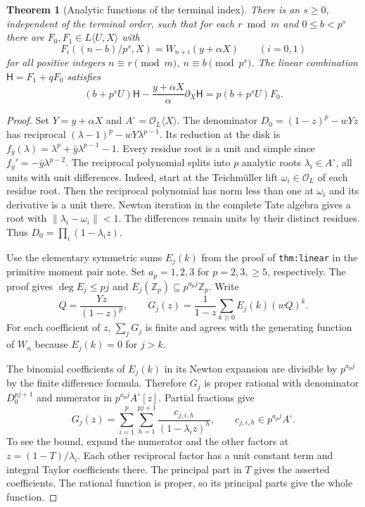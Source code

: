 \documentclass[11pt]{article}
\newtheorem{theorem}{Theorem}\newtheorem{lemma}[theorem]{Lemma}
\begin{document}
\begin{theorem}[Analytic functions of the terminal index]\label{thm:interpolation}
There is an $s\ge0$, independent of the terminal order, such that
for each $r\bmod m$ and $0\le b<p^s$ there are
$F_0,F_1\in L\langle U,X\rangle$ with
\[
 F_i\!\left((n-b)/p^s,X\right)=W_{n+i}(y+\alpha X)
 \qquad (i=0,1)
\]
for all positive integers $n\equiv r\pmod m$, $n\equiv b\pmod{p^s}$.
The linear combination $\mathsf H=F_1+qF_0$ satisfies
\[
 (b+p^sU)\mathsf H-
 \frac{y+\alpha X}{\alpha}\partial_X\mathsf H
                   =p(b+p^sU)F_0 .
\]
\end{theorem}
\begin{proof}
Set $Y=y+\alpha X$ and $A^\circ=\mathcal O_L\langle X\rangle$.
The denominator $D_0=(1-z)^p-wYz$ has reciprocal
$(\lambda-1)^p-wY\lambda^{p-1}$. Its reduction at the disk
is $f_{\bar y}(\lambda)=\lambda^p+\bar y\lambda^{p-1}-1$.
Every residue root is a unit and simple since
$f_{\bar y}'=-\bar y\lambda^{p-2}$.
The reciprocal polynomial splits into $p$ analytic roots
$\lambda_i\in A^\circ$, all units with unit differences.
Indeed, start at the Teichm\"uller lift $\omega_i\in\mathcal O_L$ of
each residue root. Then the reciprocal polynomial has norm less
than one at $\omega_i$ and its derivative is a unit there.
Newton iteration in the complete Tate algebra gives a root with
$\|\lambda_i-\omega_i\|<1$. The differences remain units by
their distinct residues. Thus $D_0=\prod_i(1-\lambda_i z)$.

Use the elementary symmetric sums $E_j(k)$ from the
proof of \texttt{thm:linear} in the primitive moment pair note.
Set $a_p=1,2,3$ for $p=2,3,\ge5$, respectively. The proof gives
$\deg E_j\le pj$ and $E_j(\mathbb Z_p)\subseteq p^{a_pj}\mathbb Z_p$.
Write
\[
 Q=\frac{Yz}{(1-z)^p},\qquad
 G_j(z)=\frac{1}{1-z}\sum_{k\ge0}E_j(k)(wQ)^k.
\]
For each coefficient of $z$, $\sum_jG_j$ is finite and agrees
with the generating function of $W_n$ because $E_j(k)=0$ for $j>k$.

The binomial coefficients of $E_j(k)$ in its Newton expansion
are divisible by $p^{a_pj}$ by the finite difference formula.
Therefore $G_j$ is proper rational with denominator
$D_0^{pj+1}$ and numerator in $p^{a_pj}A^\circ[z]$.
Partial fractions give
\[
 G_j(z)=\sum_{i=1}^{p}\sum_{h=1}^{pj+1}
                           \frac{c_{j,i,h}}{(1-\lambda_i z)^h},
 \qquad c_{j,i,h}\in p^{a_pj}A^\circ .
 \tag{1}
\]
To see the bound, expand the numerator and the other factors
at $z=(1-T)/\lambda_i$. Each other reciprocal factor has a
unit constant term and integral Taylor coefficients there.
The principal part in $T$ gives the asserted coefficients.
The rational function is proper, so its principal parts give
the whole function.


\end{proof}
\end{document}
